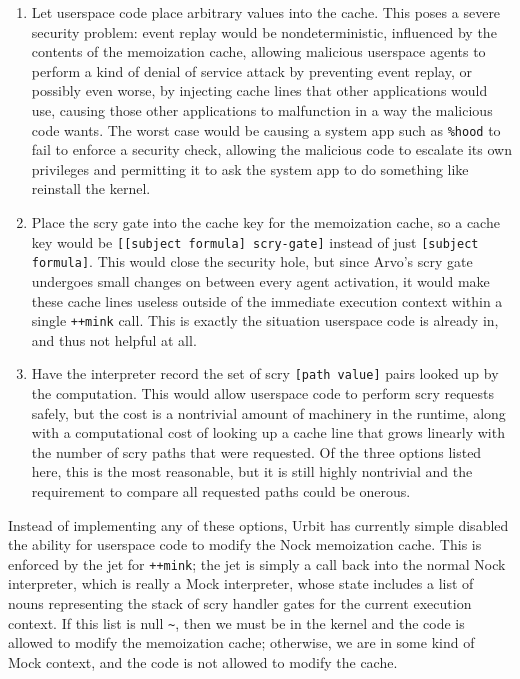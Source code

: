 \documentclass[twoside]{article}
\begin{document}
\begin{enumerate}
  \item  Let userspace code place arbitrary values into the cache.  This poses a severe security problem:  event replay would be nondeterministic, influenced by the contents of the memoization cache, allowing malicious userspace agents to perform a kind of denial of service attack by preventing event replay, or possibly even worse, by injecting cache lines that other applications would use, causing those other applications to malfunction in a way the malicious code wants.  The worst case would be causing a system app such as \lstinline[style=inlinecode]{%hood} to fail to enforce a security check, allowing the malicious code to escalate its own privileges and permitting it to ask the system app to do something like reinstall the kernel.

  \item  Place the scry gate into the cache key for the memoization cache, so a cache key would be \lstinline[style=inlinecode]{[[subject formula] scry-gate]} instead of just \lstinline[style=inlinecode]{[subject formula]}.  This would close the security hole, but since Arvo's scry gate undergoes small changes on between every agent activation, it would make these cache lines useless outside of the immediate execution context within a single \lstinline[style=inlinecode]{++mink} call.  This is exactly the situation userspace code is already in, and thus not helpful at all.

  \item  Have the interpreter record the set of scry \lstinline[style=inlinecode]{[path value]} pairs looked up by the computation.  This would allow userspace code to perform scry requests safely, but the cost is a nontrivial amount of machinery in the runtime, along with a computational cost of looking up a cache line that grows linearly with the number of scry paths that were requested.  Of the three options listed here, this is the most reasonable, but it is still highly nontrivial and the requirement to compare all requested paths could be onerous.
\end{enumerate}
\noindent
Instead of implementing any of these options, Urbit has currently simple disabled the ability for userspace code to modify the Nock memoization cache.  This is enforced by the jet for \lstinline[style=inlinecode]{++mink}; the jet is simply a call back into the normal Nock interpreter, which is really a Mock interpreter, whose state includes a list of nouns representing the stack of scry handler gates for the current execution context.  If this list is null \lstinline[style=inlinecode]{~}, then we must be in the kernel and the code is allowed to modify the memoization cache; otherwise, we are in some kind of Mock context, and the code is not allowed to modify the cache.
\end{document}

